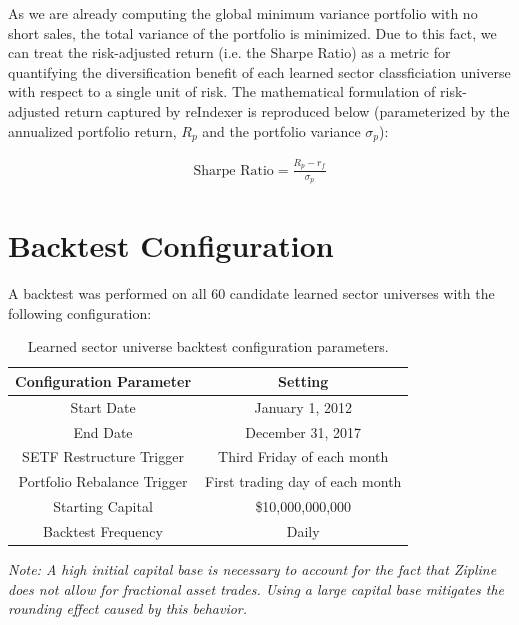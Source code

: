 \documentclass[../main.tex]{subfiles}
\begin{document}
As we are already computing the global minimum variance portfolio with no short sales, the total variance of the portfolio is minimized. Due to this fact, we can treat the risk-adjusted return (i.e. the Sharpe Ratio) as a metric for quantifying the diversification benefit of each learned sector classficiation universe with respect to a single unit of risk. The mathematical formulation of risk-adjusted return captured by reIndexer is reproduced below (parameterized by the annualized portfolio return, $R_p$ and the portfolio variance $\sigma_p$):

\begin{gather*}
    \text{Sharpe Ratio} = \frac{R_p - r_f}{\sigma_p}
\end{gather*}


\section{Backtest Configuration} \label{candidate_universe_ranking:backtest_config}

A backtest was performed on all 60 candidate learned sector universes with the following configuration:

\begin{table}[h!]
    \centering
    \begin{tabular}{|c|c|}
        \hline
        \textbf{Configuration Parameter} & \textbf{Setting} \\
        \hline
        Start Date & January 1, 2012 \\
        End Date & December 31, 2017 \\
        SETF Restructure Trigger & Third Friday of each month \\
        Portfolio Rebalance Trigger & First trading day of each month \\
        Starting Capital & \$10,000,000,000 \\
        Backtest Frequency & Daily \\
        \hline
    \end{tabular}
    \caption{Learned sector universe backtest configuration parameters.}
    \label{table:candidate_universe_ranking:backtest_configuration}
\end{table}

\textit{Note: A high initial capital base is necessary to account for the fact that Zipline does not allow for fractional asset trades. Using a large capital base mitigates the rounding effect caused by this behavior.}
\end{document}
